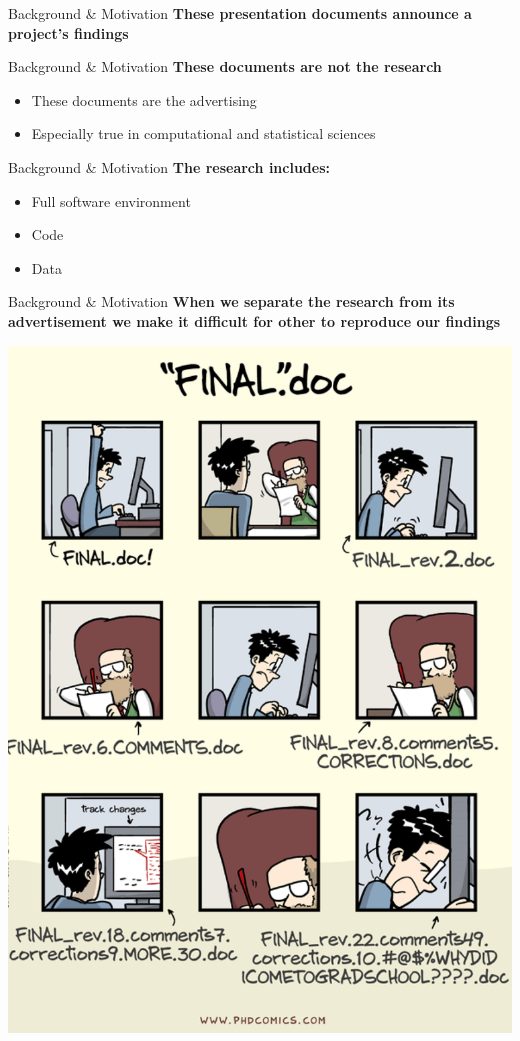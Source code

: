 \documentclass{beamer}\usepackage[]{graphicx}\usepackage[]{color}
\begin{document}
\begin{frame}[t]{Background \& Motivation}
  \textbf{These presentation documents announce a project's findings}
\end{frame}

\begin{frame}[t]{Background \& Motivation}
  \textbf{These documents are not the research}
  \begin{itemize}
 \item These documents are the advertising
  \item Especially true in computational and statistical sciences
  \end{itemize}
\end{frame}

\begin{frame}[t]{Background \& Motivation}
  \textbf{The research includes:}
  \begin{itemize}
    \item Full software environment
    \item Code
    \item Data
  \end{itemize}
\end{frame}

\begin{frame}[t]{Background \& Motivation}
  \textbf{When we separate the research from its advertisement we make it difficult for other to reproduce our findings}
\begin{center}
    \includegraphics[height=0.8\textheight,keepaspectratio]{finaldoc}
  \end{center}
\end{frame}
\end{document}
